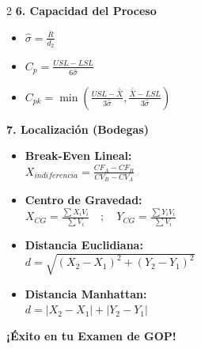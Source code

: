 \begin{multicols}{2}
\textbf{6. Capacidad del Proceso}
\begin{itemize}[leftmargin=*]
    \item $\hat{\sigma} = \frac{\bar{R}}{d_2}$
    \item $C_p = \frac{USL - LSL}{6\hat{\sigma}}$
    \item $C_{pk} = \min \left( \frac{USL - \bar{\bar{X}}}{3\hat{\sigma}}, \frac{\bar{\bar{X}} - LSL}{3\hat{\sigma}} \right)$
\end{itemize}

\textbf{7. Localización (Bodegas)}
\begin{itemize}[leftmargin=*]
    \item \textbf{Break-Even Lineal:}\\
    $X_{indiferencia} = \frac{CF_A - CF_B}{CV_B - CV_A}$
    \item \textbf{Centro de Gravedad:}\\
    $X_{CG} = \frac{\sum X_i V_i}{\sum V_i} \quad ; \quad Y_{CG} = \frac{\sum Y_i V_i}{\sum V_i}$
    \item \textbf{Distancia Euclidiana:}\\
    $d = \sqrt{(X_2 - X_1)^2 + (Y_2 - Y_1)^2}$
    \item \textbf{Distancia Manhattan:}\\
    $d = |X_2 - X_1| + |Y_2 - Y_1|$
\end{itemize}

\end{multicols}

\vspace{1cm}
\begin{center}
\textbf{¡Éxito en tu Examen de GOP!}
\end{center}
